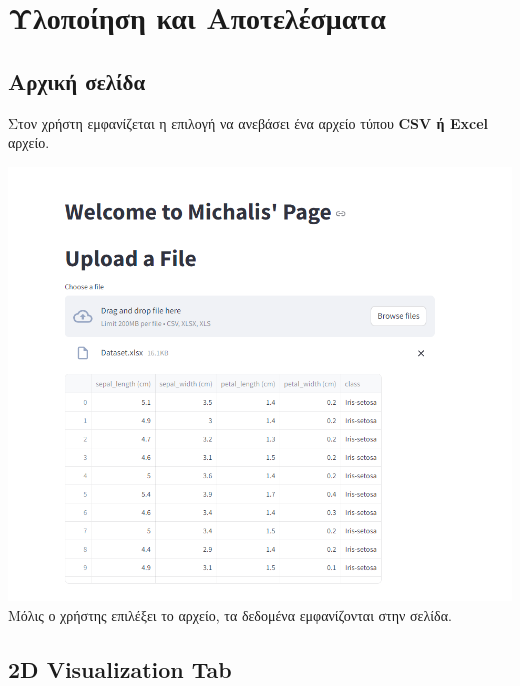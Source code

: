 \documentclass{article}
\begin{document}
\newpage
\section{Υλοποίηση και Αποτελέσματα}

\subsection{Αρχική σελίδα}

Στον χρήστη εμφανίζεται η επιλογή να ανεβάσει ένα αρχείο τύπου \textbf{CSV ή Excel} αρχείο.

\includegraphics[width=1.0\linewidth]{home_page.png}
Μόλις ο χρήστης επιλέξει το αρχείο, τα δεδομένα εμφανίζονται στην σελίδα.

\subsection{2D Visualization Tab}
\end{document}
